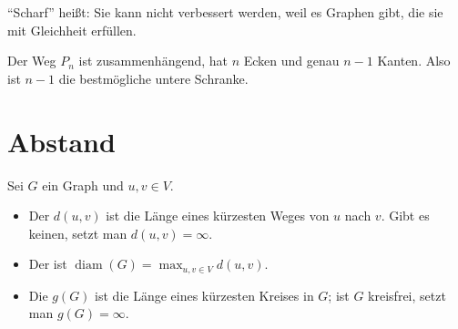 \begin{merksatz}
\enquote{Scharf} heißt: Sie kann nicht verbessert werden, weil es Graphen gibt, die sie mit Gleichheit erfüllen.

Der Weg $P_n$ ist zusammenhängend, hat $n$ Ecken und genau $n-1$ Kanten. Also ist $n-1$ die bestmögliche untere Schranke.

\begin{center}
\end{center}

\begin{center}
\begin{minipage}{0.88\textwidth}
\end{minipage}
\end{center}
\end{merksatz}

\section{Abstand}

\begin{definition}
Sei $G$ ein Graph und $u,v \in V$.
\begin{itemize}[leftmargin=1.4em, itemsep=4pt]
\item Der  $d(u,v)$ ist die Länge eines kürzesten Weges von $u$ nach $v$. Gibt es keinen, setzt man $d(u,v) = \infty$.
\item Der  ist $\operatorname{diam}(G) = \max_{u,v \in V} d(u,v)$.
\item Die  $g(G)$ ist die Länge eines kürzesten Kreises in $G$; ist $G$ kreisfrei, setzt man $g(G) = \infty$.
\end{itemize}
\end{definition}

